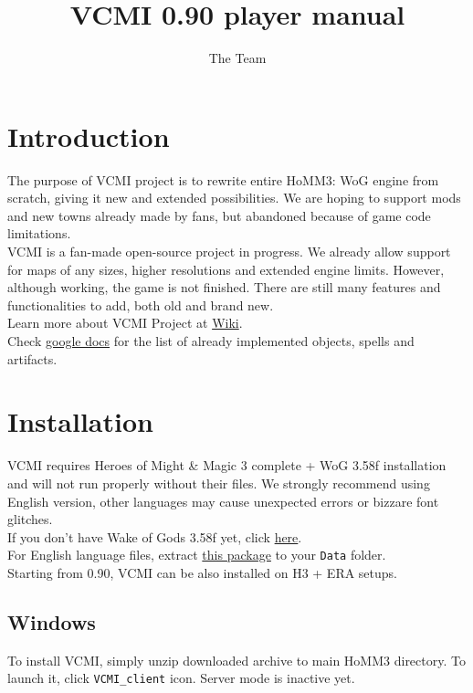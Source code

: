 \documentclass[a4size,final]{article}
\begin{document}
\normalsize
\pagestyle{plain}
\setcounter{secnumdepth}{1}
\title{\Huge VCMI 0.90 player manual}
\author{The Team}
\maketitle
\section{Introduction}
The purpose of VCMI project is to rewrite entire HoMM3: WoG engine from scratch, giving it new and extended possibilities. We are hoping to support mods and new towns already made by fans, but abandoned because of game code limitations.\\
VCMI is a fan-made open-source project in progress. We already allow support for maps of any sizes, higher resolutions and extended engine limits. However, although working, the game is not finished. There are still many features and functionalities to add, both old and brand new.\smallskip\\
Learn more about VCMI Project at \href{http://wiki.vcmi.eu/index.php?title=VCMI}{Wiki}.\\
Check \href{http://spreadsheets.google.com/ccc?key=pRhYM0YkAF9lIpLe4raNAWA&hl=pl}{google docs} for the list of already implemented objects, spells and artifacts.
\section{Installation}
VCMI requires Heroes of Might \& Magic 3 complete + WoG 3.58f installation and will not run properly without their files. We strongly recommend using English version, other languages may cause unexpected errors or bizzare font glitches.\\
If you don't have Wake of Gods 3.58f yet, click \href{http://www.maps4heroes.com/heroes3/files/allinone_358f.zip}{here}.\\
For English language files, extract \href{http://download.vcmi.eu/dataEN.7z}{this package} to your \texttt{Data} folder.\bigskip\\
Starting from 0.90, VCMI can be also installed on H3 + ERA setups.
\subsection{Windows}
To install VCMI, simply unzip downloaded archive to main HoMM3 directory. To launch it, click \texttt{VCMI\_client} icon. Server mode is inactive yet.\medskip\\
\end{document}
